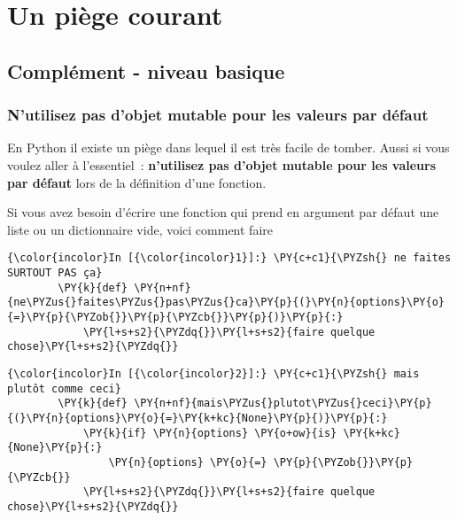     
    
    
    

    

    \hypertarget{un-piuxe8ge-courant}{%
\section{Un piège courant}\label{un-piuxe8ge-courant}}

    \hypertarget{compluxe9ment---niveau-basique}{%
\subsection{Complément - niveau
basique}\label{compluxe9ment---niveau-basique}}

    \hypertarget{nutilisez-pas-dobjet-mutable-pour-les-valeurs-par-duxe9faut}{%
\subsubsection{N'utilisez pas d'objet mutable pour les valeurs par
défaut}\label{nutilisez-pas-dobjet-mutable-pour-les-valeurs-par-duxe9faut}}

    En Python il existe un piège dans lequel il est très facile de tomber.
Aussi si vous voulez aller à l'essentiel~: \textbf{n'utilisez pas
d'objet mutable pour les valeurs par défaut} lors de la définition d'une
fonction.

Si vous avez besoin d'écrire une fonction qui prend en argument par
défaut une liste ou un dictionnaire vide, voici comment faire

    \begin{Verbatim}[commandchars=\\\{\}]
{\color{incolor}In [{\color{incolor}1}]:} \PY{c+c1}{\PYZsh{} ne faites SURTOUT PAS ça}
        \PY{k}{def} \PY{n+nf}{ne\PYZus{}faites\PYZus{}pas\PYZus{}ca}\PY{p}{(}\PY{n}{options}\PY{o}{=}\PY{p}{\PYZob{}}\PY{p}{\PYZcb{}}\PY{p}{)}\PY{p}{:}
            \PY{l+s+s2}{\PYZdq{}}\PY{l+s+s2}{faire quelque chose}\PY{l+s+s2}{\PYZdq{}}
\end{Verbatim}


    \begin{Verbatim}[commandchars=\\\{\}]
{\color{incolor}In [{\color{incolor}2}]:} \PY{c+c1}{\PYZsh{} mais plutôt comme ceci}
        \PY{k}{def} \PY{n+nf}{mais\PYZus{}plutot\PYZus{}ceci}\PY{p}{(}\PY{n}{options}\PY{o}{=}\PY{k+kc}{None}\PY{p}{)}\PY{p}{:}
            \PY{k}{if} \PY{n}{options} \PY{o+ow}{is} \PY{k+kc}{None}\PY{p}{:} 
                \PY{n}{options} \PY{o}{=} \PY{p}{\PYZob{}}\PY{p}{\PYZcb{}}
            \PY{l+s+s2}{\PYZdq{}}\PY{l+s+s2}{faire quelque chose}\PY{l+s+s2}{\PYZdq{}}
\end{Verbatim}


